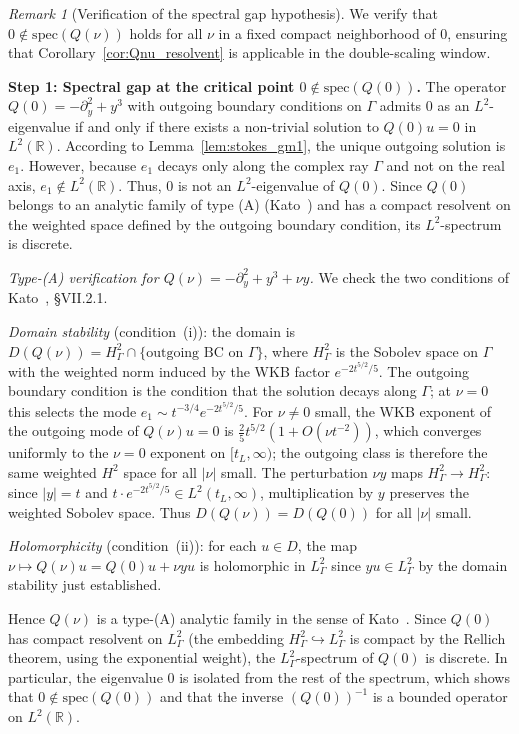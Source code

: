 \documentclass[12pt,a4paper]{amsart}
\theoremstyle{remark}
\newtheorem{remark}[theorem]{Remark}
\begin{document}
\begin{remark}[Verification of the spectral gap hypothesis]
\label{rem:specgap_nu0}
We verify that $0 \notin \mathrm{spec}(Q(\nu))$ holds for all $\nu$ in a fixed compact neighborhood
of $0$, ensuring that Corollary~\ref{cor:Qnu_resolvent} is applicable in the double-scaling window.

\medskip
\noindent\textbf{Step 1: Spectral gap at the critical point $0 \notin \mathrm{spec}(Q(0))$.}
The operator $Q(0) = -\partial_y^2 + y^3$ with outgoing boundary conditions on $\Gamma$
admits $0$ as an $L^2$-eigenvalue if and only if there exists a non-trivial solution to
$Q(0)u = 0$ in $L^2(\mathbb{R})$. According to Lemma~\ref{lem:stokes_gm1}, the unique outgoing
solution is $e_1$. However, because $e_1$ decays only along the complex ray $\Gamma$
and not on the real axis, $e_1 \notin L^2(\mathbb{R})$. Thus, $0$ is not an $L^2$-eigenvalue of $Q(0)$.
Since $Q(0)$ belongs to an analytic family of type (A) (Kato~\cite{Kato66}) and has a compact resolvent
on the weighted space defined by the outgoing boundary condition, its $L^2$-spectrum is discrete.

\emph{Type-(A) verification for $Q(\nu) = -\partial_y^2 + y^3 + \nu y$.}
We check the two conditions of Kato~\cite{Kato66}, \S VII.2.1.

\emph{Domain stability} (condition~(i)): the domain is
$D(Q(\nu)) = H^2_\Gamma \cap \{\text{outgoing BC on }\Gamma\}$, where
$H^2_\Gamma$ is the Sobolev space on $\Gamma$ with the weighted norm
induced by the WKB factor $e^{-2t^{5/2}/5}$.  The outgoing boundary
condition is the condition that the solution decays along $\Gamma$; at
$\nu=0$ this selects the mode $e_1 \sim t^{-3/4}e^{-2t^{5/2}/5}$.  For
$\nu \neq 0$ small, the WKB exponent of the outgoing mode of $Q(\nu)u=0$
is $\tfrac{2}{5}t^{5/2}(1 + O(\nu t^{-2}))$, which converges uniformly
to the $\nu=0$ exponent on $[t_L, \infty)$; the outgoing class is
therefore the same weighted $H^2$ space for all $|\nu|$ small.  The
perturbation $\nu y$ maps $H^2_\Gamma \to H^2_\Gamma$: since $|y| = t$
and $t \cdot e^{-2t^{5/2}/5} \in L^2(t_L,\infty)$, multiplication by
$y$ preserves the weighted Sobolev space.  Thus $D(Q(\nu)) = D(Q(0))$
for all $|\nu|$ small.

\emph{Holomorphicity} (condition~(ii)): for each $u \in D$, the map
$\nu \mapsto Q(\nu)u = Q(0)u + \nu y u$ is holomorphic in
$L^2_\Gamma$ since $yu \in L^2_\Gamma$ by the domain stability just
established.

Hence $Q(\nu)$ is a type-(A) analytic family in the sense of
Kato~\cite{Kato66}.  Since $Q(0)$ has compact resolvent on
$L^2_\Gamma$ (the embedding $H^2_\Gamma \hookrightarrow L^2_\Gamma$ is
compact by the Rellich theorem, using the exponential weight), the
$L^2_\Gamma$-spectrum of $Q(0)$ is discrete.
In particular, the eigenvalue $0$ is isolated from the rest of the spectrum, which shows that
$0 \notin \mathrm{spec}(Q(0))$ and that the inverse $(Q(0))^{-1}$ is a bounded operator on $L^2(\mathbb{R})$.


\end{remark}
\end{document}
